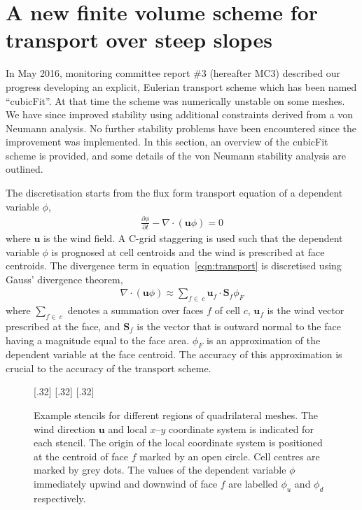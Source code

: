 \documentclass[a4paper,11pt]{article}
\begin{document}
\section{A new finite volume scheme for transport over steep slopes}
In May 2016, monitoring committee report \#3 (hereafter MC3) described our progress developing an explicit, Eulerian transport scheme which has been named ``cubicFit''.  At that time the scheme was numerically unstable on some meshes.  We have since improved stability using additional constraints derived from a von Neumann analysis.  No further stability problems have been encountered since the improvement was implemented.  In this section, an overview of the cubicFit scheme is provided, and some details of the von Neumann stability analysis are outlined.

The discretisation starts from the flux form transport equation of a dependent variable $\phi$,
\begin{align}
	\frac{\partial \phi}{\partial t} - \nabla \cdot \left( \mathbf{u} \phi \right) = 0 \label{eqn:transport}
\end{align}
where $\mathbf{u}$ is the wind field.  A C-grid staggering is used such that the dependent variable $\phi$ is prognosed at cell centroids and the wind is prescribed at face centroids.  The divergence term in equation~\eqref{eqn:transport} is discretised using Gauss' divergence theorem,
\begin{align}
	\nabla \cdot \left( \mathbf{u} \phi \right) \approx \sum_{f \in\:c} \mathbf{u}_f \cdot \mathbf{S}_f \phi_F
\end{align}
where $\sum_{f \in\:c}$ denotes a summation over faces $f$ of cell $c$, $\mathbf{u}_f$ is the wind vector prescribed at the face, and $\mathbf{S}_f$ is the vector that is outward normal to the face having a magnitude equal to the face area.  $\phi_F$ is an approximation of the dependent variable at the face centroid.  The accuracy of this approximation is crucial to the accuracy of the transport scheme.

\begin{figure}
	\centering
	[.32\linewidth]{}
	[.32\linewidth]{}
	[.32\linewidth]{}
	\caption{Example stencils for different regions of quadrilateral meshes.  The wind direction $\mathbf{u}$ and local $x$--$y$ coordinate system is indicated for each stencil.  The origin of the local coordinate system is positioned at the centroid of face $f$ marked by an open circle.  Cell centres are marked by grey dots.  The values of the dependent variable $\phi$ immediately upwind and downwind of face $f$ are labelled $\phi_u$ and $\phi_d$ respectively.}
	\label{fig:stencils}
\end{figure}
\end{document}

